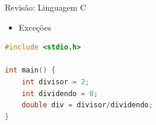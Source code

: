 \begin{frame}[fragile]{Revisão: Linguagem C}
    \begin{itemize}
        \item Exceções
    \end{itemize}

\begin{lstlisting}[language=C,basicstyle=\ttfamily\scriptsize]
#include <stdio.h>

int main() {
    int divisor = 2;
    int dividendo = 0;
    double div = divisor/dividendo;
}
\end{lstlisting}
\end{frame}